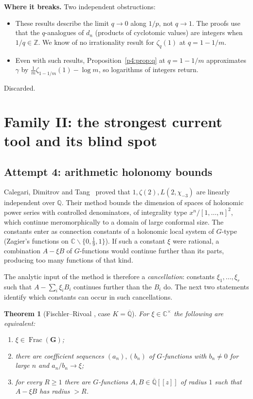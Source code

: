 \documentclass[11pt,a4paper]{article}
\newtheorem{theorem}{Theorem}[section]
\theoremstyle{definition}
\theoremstyle{remark}
\newcommand{\Q}{\mathbb Q}
\newcommand{\Z}{\mathbb Z}
\newcommand{\C}{\mathbb C}
\newcommand{\Qbar}{\overline{\mathbb Q}}
\newcommand{\bG}{\mathbf G}
\DeclareMathOperator{\Frac}{Frac}
\numberwithin{equation}{section}
\begin{document}
\noindent\textbf{Where it breaks.} Two independent obstructions:
\begin{itemize}[leftmargin=2em]
\item These results describe the limit $q\to0$ along $1/p$, not $q\to1$. The proofs use that the $q$-analogues of $d_n$ (products of cyclotomic values) are integers when $1/q\in\Z$. We know of no irrationality result for $\zeta_q(1)$ at $q=1-1/m$.
\item Even with such results, Proposition~\ref{p4:prop:q} at $q=1-1/m$ approximates $\gamma$ by $\frac1m\zeta_{1-1/m}(1)-\log m$, so logarithms of integers return.
\end{itemize}
Discarded.

\section{Family II: the strongest current tool and its blind spot}\label{p4:sec:holonomy}

\subsection{Attempt 4: arithmetic holonomy bounds}

Calegari, Dimitrov and Tang~\cite{p4:CDT} proved that $1,\zeta(2),L(2,\chi_{-3})$ are linearly independent over $\Q$. Their method bounds the dimension of spaces of holonomic power series with controlled denominators, of integrality type $x^n/[1,\dots,n]^2$, which continue meromorphically to a domain of large conformal size. The constants enter as connection constants of a holonomic local system of $G$-type (Zagier's functions on $\C\smallsetminus\{0,\tfrac19,1\}$). If such a constant $\xi$ were rational, a combination $A-\xi B$ of $G$-functions would continue further than its parts, producing too many functions of that kind.

The analytic input of the method is therefore a \emph{cancellation}: constants $\xi_1,\dots,\xi_r$ such that $A-\sum_i\xi_iB_i$ continues further than the $B_i$ do. The next two statements identify which constants can occur in such cancellations.

\begin{theorem}[Fischler--Rivoal {\cite[Thm.~2]{p4:FR14}}, case $K=\Qbar$]\label{p4:thm:FR}
For $\xi\in\C^\times$ the following are equivalent:
\begin{enumerate}[label=(\roman*),leftmargin=2em]
\item $\xi\in\Frac(\bG)$;
\item there are coefficient sequences $(a_n),(b_n)$ of $G$-functions with $b_n\ne0$ for large $n$ and $a_n/b_n\to\xi$;
\item for every $R\ge1$ there are $G$-functions $A,B\in\Qbar[[z]]$ of radius $1$ such that $A-\xi B$ has radius $>R$.
\end{enumerate}
\end{theorem}
\end{document}
